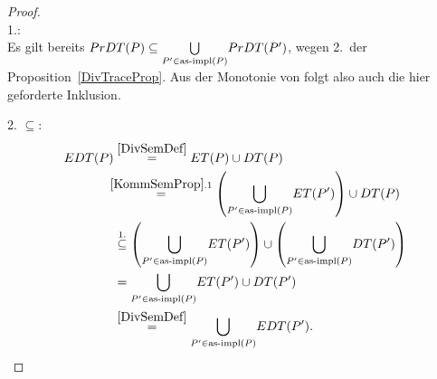 \begin{proof}\mbox{}\\
  1.:\\
  Es gilt bereits $PrDT (P) \subseteq \underset{P'\in\mathrm{as}\text{-}\mathrm{impl} (P)}{\bigcup}
  PrDT (P')$, wegen 2.\ der Proposition~\ref{DivTraceProp}. Aus der Monotonie
  von \cont{} folgt also auch die hier geforderte Inklusion.

  2. \glqq$\subseteq$\grqq{}:
  \begin{align*}
    \EDT (P)&\overset{\ref{DivSemDef}}{=} \ET (P)\cup \DT (P)\\
    &\hspace{-0.2cm}\overset{\ref{KommSemProp}.1}{=} \left(\underset{P'\in
    \asimp (P)}{\bigcup} \ET (P')\right)\cup \DT (P)\\
    &\overset{1.}{\subseteq} \left(\underset{P'\in
    \asimp (P)}{\bigcup} \ET (P')\right)\cup \left(\underset{P'\in \asimp
    (P)}{\bigcup} \DT (P')\right)\\
    &= \underset{P'\in \asimp (P)}{\bigcup} \ET (P') \cup \DT (P')\\
    &\overset{\ref{DivSemDef}}{=} \underset{P'\in\asimp (P)}{\bigcup} \EDT
    (P').\\
  \end{align*}


\end{proof}
